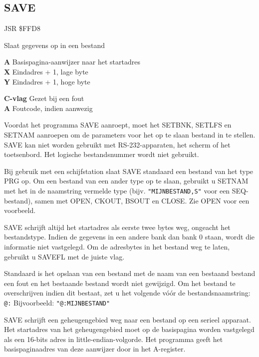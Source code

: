 \subsection{SAVE}
\label{KERNAL Jump Table!SAVE}
\begin{description}[leftmargin=2cm,style=nextline]
    \item [Adres:] JSR \$FFD8    \item [Omschrijving:] Slaat gegevens op in een bestand    \item [Invoer:]        \textbf{A} Basispagina-aanwijzer naar het startadres \\        \textbf{X} Eindadres + 1, lage byte \\        \textbf{Y} Eindadres + 1, hoge byte    \item [Uitvoer:]        \textbf{C-vlag} Gezet bij een fout \\        \textbf{A} Foutcode, indien aanwezig    \item [Opmerkingen:]        Voordat het programma SAVE aanroept, moet het SETBNK, SETLFS en SETNAM aanroepen om de parameters voor het op te slaan bestand in te stellen. SAVE kan niet worden gebruikt met RS-232-apparaten, het scherm of het toetsenbord. Het logische bestandsnummer wordt niet gebruikt.

        Bij gebruik met een schijfstation slaat SAVE standaard een bestand van het type PRG op. Om een bestand van een ander type op te slaan, gebruikt u SETNAM met het in de naamstring vermelde type (bijv. \texttt{"MIJNBESTAND,S"} voor een SEQ-bestand), samen met OPEN, CKOUT, BSOUT en CLOSE. Zie OPEN voor een voorbeeld.

        SAVE schrijft altijd het startadres als eerste twee bytes weg, ongeacht het bestandstype. Indien de gegevens in een andere bank dan bank 0 staan, wordt die informatie niet vastgelegd. Om de adresbytes in het bestand weg te laten, gebruikt u SAVEFL met de juiste vlag.

        Standaard is het opslaan van een bestand met de naam van een bestaand bestand een fout en het bestaande bestand wordt niet gewijzigd. Om het bestand te overschrijven indien dit bestaat, zet u het volgende vóór de bestandsnaamstring: \texttt{@:} Bijvoorbeeld: \texttt{"@:MIJNBESTAND"}

        SAVE schrijft een geheugengebied weg naar een bestand op een serieel apparaat. Het startadres van het geheugengebied moet op de basispagina worden vastgelegd als een 16-bits adres in little-endian-volgorde. Het programma geeft het basispaginaadres van deze aanwijzer door in het A-register.


\end{description}
